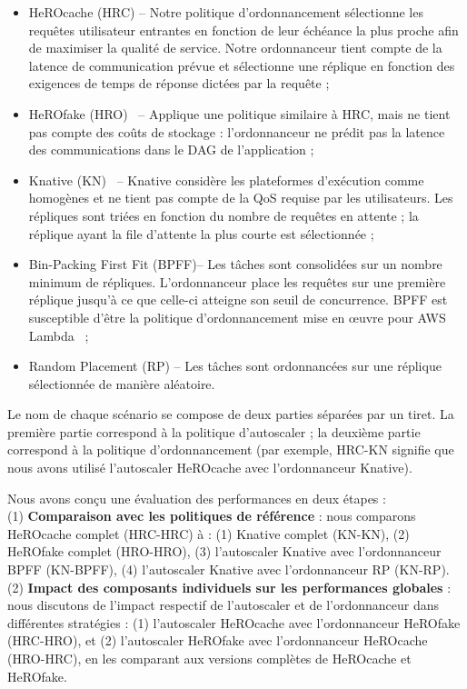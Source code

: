 \begin{itemize}
    \item HeROcache (HRC) -- Notre politique d'ordonnancement sélectionne les requêtes utilisateur entrantes en fonction de leur échéance la plus proche afin de maximiser la qualité de service. Notre ordonnanceur tient compte de la latence de communication prévue et sélectionne une réplique en fonction des exigences de temps de réponse dictées par la requête ;
    \item HeROfake (HRO)~\cite{herofake} -- Applique une politique similaire à HRC, mais ne tient pas compte des coûts de stockage : l'ordonnanceur ne prédit pas la latence des communications dans le DAG de l'application ;
    \item Knative (KN)~\cite{knative} -- Knative considère les plateformes d'exécution comme homogènes et ne tient pas compte de la QoS requise par les utilisateurs. Les répliques sont triées en fonction du nombre de requêtes en attente ; la réplique ayant la file d'attente la plus courte est sélectionnée ;
    \item Bin-Packing First Fit (BPFF)-- Les tâches sont consolidées sur un nombre minimum de répliques. L'ordonnanceur place les requêtes sur une première réplique jusqu'à ce que celle-ci atteigne son seuil de concurrence. BPFF est susceptible d'être la politique d'ordonnancement mise en œuvre pour AWS Lambda~\cite{wangPeekingCurtainsServerlessb} ;
    \item Random Placement (RP) -- Les tâches sont ordonnancées sur une réplique sélectionnée de manière aléatoire.
\end{itemize}

Le nom de chaque scénario se compose de deux parties séparées par un tiret. La première partie correspond à la politique d'autoscaler ; la deuxième partie correspond à la politique d'ordonnancement (par exemple, HRC-KN signifie que nous avons utilisé l'autoscaler HeROcache avec l'ordonnanceur Knative).

Nous avons conçu une évaluation des performances en deux étapes : \\
(1) \textbf{Comparaison avec les politiques de référence} : nous comparons HeROcache complet (HRC-HRC) à : (1) Knative complet (KN-KN), (2) HeROfake complet (HRO-HRO), (3) l'autoscaler Knative avec l'ordonnanceur BPFF (KN-BPFF), (4) l'autoscaler Knative avec l'ordonnanceur RP (KN-RP). \\
(2) \textbf{Impact des composants individuels sur les performances globales} : nous discutons de l'impact respectif de l'autoscaler et de l'ordonnanceur dans différentes stratégies : (1) l'autoscaler HeROcache avec l'ordonnanceur HeROfake (HRC-HRO), et (2) l'autoscaler HeROfake avec l'ordonnanceur HeROcache (HRO-HRC), en les comparant aux versions complètes de HeROcache et HeROfake.

